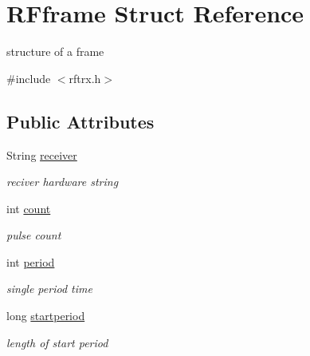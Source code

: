 \hypertarget{struct_r_fframe}{}\section{R\+Fframe Struct Reference}
\label{struct_r_fframe}


structure of a frame  




{\ttfamily \#include $<$rftrx.\+h$>$}

\subsection*{Public Attributes}
\begin{DoxyCompactItemize}
\item 
\mbox{\label{struct_r_fframe_aea3fb8c3703ad8db875597b20c828bdc}} 
String \mbox{\hyperlink{struct_r_fframe_aea3fb8c3703ad8db875597b20c828bdc}{receiver}}
\begin{DoxyCompactList}\small\item\em reciver hardware string \end{DoxyCompactList}\item 
\mbox{\label{struct_r_fframe_a23bdce449d5c06818d2752cc7bdd0e4c}} 
int \mbox{\hyperlink{struct_r_fframe_a23bdce449d5c06818d2752cc7bdd0e4c}{count}}
\begin{DoxyCompactList}\small\item\em pulse count \end{DoxyCompactList}\item 
\mbox{\label{struct_r_fframe_a7d12f2f17368d41e2049ad5e881d348b}} 
int \mbox{\hyperlink{struct_r_fframe_a7d12f2f17368d41e2049ad5e881d348b}{period}}
\begin{DoxyCompactList}\small\item\em single period time \end{DoxyCompactList}\item 
\mbox{\label{struct_r_fframe_a8b67dc8a01ce0507e5a14047ec5f8cb0}} 
long \mbox{\hyperlink{struct_r_fframe_a8b67dc8a01ce0507e5a14047ec5f8cb0}{startperiod}}
\begin{DoxyCompactList}\small\item\em length of start period \end{DoxyCompactList}\item 

\end{DoxyCompactItemize}
